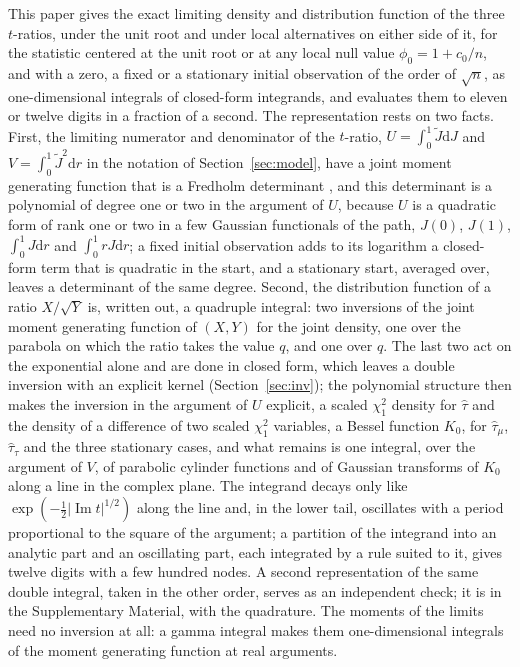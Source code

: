 \documentclass[ecta,nameyear,final]{econsocart}
\newcommand{\dr}[1]{{\mathrm d}#1}
\newcommand{\Ima}{\operatorname{Im}}
\theoremstyle{plain}
\theoremstyle{definition}
\begin{document}
This paper gives the exact limiting density and distribution function of the three $t$-ratios, under the unit root and under local alternatives on either side of it, for the statistic centered at the unit root or at any local null value $\phi_0=1+c_0/n$, and with a zero, a fixed or a stationary initial observation of the order of $\sqrt n$, as one-dimensional integrals of closed-form integrands, and evaluates them to eleven or twelve digits in a fraction of a second.  The representation rests on two facts.  First, the limiting numerator and denominator of the $t$-ratio, $U=\int_0^1\tilde J\dr{J}$ and $V=\int_0^1\tilde J^2\dr{r}$ in the notation of Section~\ref{sec:model}, have a joint moment generating function that is a Fredholm determinant \citep{NabeyaTanaka1990,NabeyaSorensen1994}, and this determinant is a polynomial of degree one or two in the argument of $U$, because $U$ is a quadratic form of rank one or two in a few Gaussian functionals of the path, $J(0)$, $J(1)$, $\int_0^1J\dr{r}$ and $\int_0^1rJ\dr{r}$; a fixed initial observation adds to its logarithm a closed-form term that is quadratic in the start, and a stationary start, averaged over, leaves a determinant of the same degree.  Second, the distribution function of a ratio $X/\sqrt Y$ is, written out, a quadruple integral: two inversions of the joint moment generating function of $(X,Y)$ for the joint density, one over the parabola on which the ratio takes the value $q$, and one over $q$.  The last two act on the exponential alone and are done in closed form, which leaves a double inversion with an explicit kernel (Section~\ref{sec:inv}); the polynomial structure then makes the inversion in the argument of $U$ explicit, a scaled $\chi^2_1$ density for $\hat\tau$ and the density of a difference of two scaled $\chi^2_1$ variables, a Bessel function $K_0$, for $\hat\tau_\mu$, $\hat\tau_\tau$ and the three stationary cases, and what remains is one integral, over the argument of $V$, of parabolic cylinder functions and of Gaussian transforms of $K_0$ along a line in the complex plane.  The integrand decays only like $\exp(-\frac12|\Ima t|^{1/2})$ along the line and, in the lower tail, oscillates with a period proportional to the square of the argument; a partition of the integrand into an analytic part and an oscillating part, each integrated by a rule suited to it, gives twelve digits with a few hundred nodes.  A second representation of the same double integral, taken in the other order, serves as an independent check; it is in the Supplementary Material, with the quadrature.  The moments of the limits need no inversion at all: a gamma integral makes them one-dimensional integrals of the moment generating function at real arguments.
\end{document}
